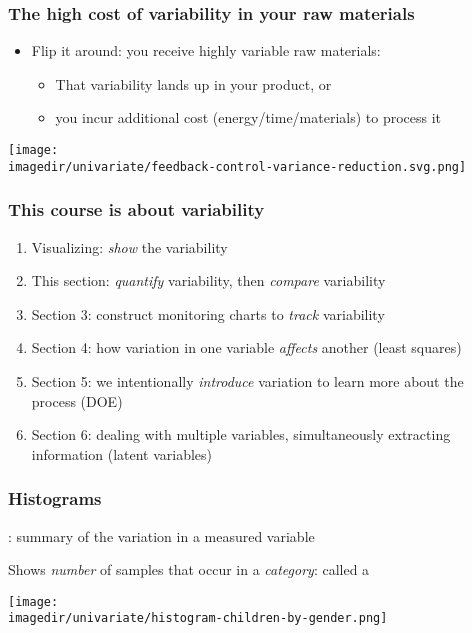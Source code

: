 \begin{frame}\frametitle{The high cost of variability in your raw materials}
	\begin{itemize}
		\item	Flip it around: you receive highly variable raw materials:
		\begin{itemize}
			\item	That variability lands up in your product, or
			\item	you incur additional cost (energy/time/materials) to process it
		\end{itemize}
	\end{itemize}
	\begin{center}
		\texttt{[image: \\imagedir/univariate/feedback-control-variance-reduction.svg.png]}
	\end{center}
\end{frame}

\begin{frame}\frametitle{This course is about variability}
	\begin{enumerate}
		\item	Visualizing: \emph{show} the variability
		\item	This section: \emph{quantify} variability, then \emph{compare} variability
		\item	Section 3: construct monitoring charts to \emph{track} variability
		\item	Section 4: how variation in one variable \emph{affects} another (least squares)
		\item	Section 5: we intentionally \emph{introduce} variation to learn more about the process (DOE)
		\item	Section 6: dealing with multiple variables, simultaneously extracting information (latent variables)
	\end{enumerate}
\end{frame}

\begin{frame}\frametitle{Histograms}
	{}: summary of the variation in a measured variable

	Shows \emph{number} of samples that occur in a \emph{category}: called a {}
	\begin{center}
		\texttt{[image: \\imagedir/univariate/histogram-children-by-gender.png]}
	\end{center}
\end{frame}

